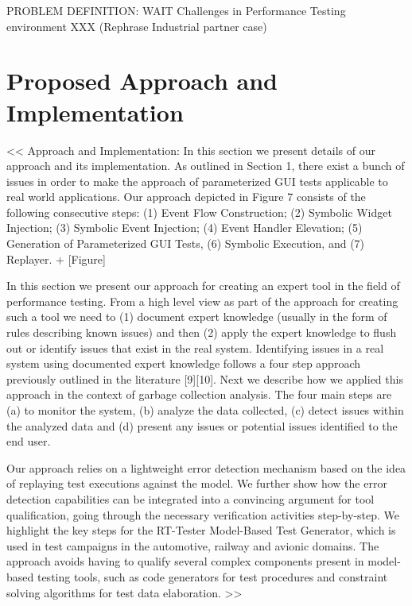 \documentclass[runningheads,a4paper]{llncs}
\begin{document}
PROBLEM DEFINITION: WAIT Challenges in Performance Testing environment 
XXX (Rephrase Industrial partner case)



\section{Proposed Approach and Implementation}

<<
Approach and Implementation: In this section we present details of our approach and its 
implementation. As outlined in Section 1, there exist a bunch of issues in order to make the 
approach of parameterized GUI tests applicable to real world applications. Our
approach depicted in Figure 7 consists of the following consecutive steps: (1)
Event Flow Construction; (2) Symbolic Widget Injection; (3) Symbolic Event
Injection; (4) Event Handler Elevation; (5) Generation of Parameterized GUI
Tests, (6) Symbolic Execution, and (7) Replayer. + [Figure]


In this section we present our approach for creating an expert tool in the
field of performance testing. From a high level view as part of the approach for 
creating such a tool we need to (1) document expert knowledge (usually in the form 
of rules describing known issues) and then (2) apply the expert knowledge to flush out 
or identify issues that exist in the real system. Identifying issues in a real system 
using documented expert knowledge follows a four step approach previously outlined in 
the literature [9][10]. Next we describe how we applied this approach in the context of 
garbage collection analysis. The four main steps are (a) to monitor the system, (b) 
analyze the data collected, (c) detect issues within the analyzed data and (d) present 
any issues or potential issues identified to the end user.

Our approach relies on a lightweight error detection mechanism based on the idea 
of replaying test executions against the model. We further show how the
error detection capabilities can be integrated into a convincing argument
for tool qualification, going through the necessary verification activities
step-by-step. We highlight the key steps for the RT-Tester Model-Based
Test Generator, which is used in test campaigns in the automotive, railway
and avionic domains. The approach avoids having to qualify several
complex components present in model-based testing tools, such as code
generators for test procedures and constraint solving algorithms for test
data elaboration.
>>
\end{document}
